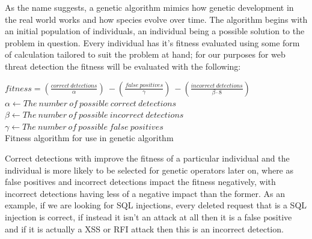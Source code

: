 As the name suggests, a genetic algorithm mimics how genetic development in the real world works and how species evolve over time.  The algorithm begins with an initial population of individuals, an individual being a possible solution to the problem in question.  Every individual has it's fitness evaluated using some form of calculation tailored to suit the problem at hand; for our purposes for web threat detection the fitness will be evaluated with the following:

\begin{algorithm}[H]
	\centering

	$fitness = (\frac{correct\ detections}{\alpha})\ - (\frac{false\ positives}{\gamma})\ - (\frac{incorrect\ detections}{\beta \cdot 8})$ \\
	
	$\alpha \leftarrow The\ number\ of\ possible\ correct\ detections$ \\
	$\beta \leftarrow The\ number\ of\ possible\ incorrect\ detections$ \\
	$\gamma \leftarrow The\ number\ of\ possible\ false\ positives$ \\
	
	\caption{Fitness algorithm for use in genetic algorithm}
	\label{alg:fitness}
	\vspace{2cm}
\end{algorithm}

Correct detections with improve the fitness of a particular individual and the individual is more likely to be selected for genetic operators later on, where as false positives and incorrect detections impact the fitness negatively, with incorrect detections having less of a negative impact than the former.  As an example, if we are looking for SQL injections, every deleted request that is a SQL injection is correct, if instead it isn't an attack at all then it is a false positive and if it is actually a XSS or RFI attack then this is an incorrect detection.

